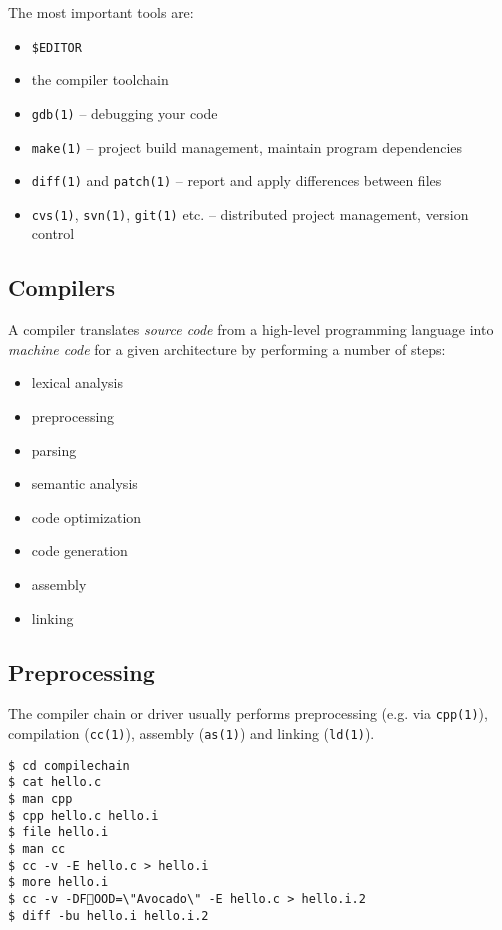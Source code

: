\documentclass[xga]{xdvislides}
\begin{document}
The most important tools are:
\begin{itemize}
	\item \verb+$EDITOR+
	\item the compiler toolchain
	\item {\tt gdb(1)} -- debugging your code
	\item {\tt make(1)} -- project build management, maintain program
		dependencies
	\item {\tt diff(1)} and {\tt patch(1)} -- report and apply differences
		between files
	\item {\tt cvs(1)}, {\tt svn(1)}, {\tt git(1)} etc. -- distributed project management,
		 version control
\end{itemize}

\subsection{Compilers}

A compiler translates {\em source code} from a high-level programming
language into {\em machine code} for a given architecture by performing a
number of steps:

\begin{itemize}
	\item lexical analysis
	\item preprocessing
	\item parsing
	\item semantic analysis
	\item code optimization
	\item code generation
	\item assembly
	\item linking
\end{itemize}

\subsection{Preprocessing}

The compiler chain or driver usually performs
preprocessing (e.g. via {\tt cpp(1)}), compilation
({\tt cc(1)}), assembly ({\tt as(1)}) and linking
({\tt ld(1)}).

\begin{verbatim}
$ cd compilechain
$ cat hello.c
$ man cpp
$ cpp hello.c hello.i
$ file hello.i
$ man cc
$ cc -v -E hello.c > hello.i
$ more hello.i
$ cc -v -DFOOD=\"Avocado\" -E hello.c > hello.i.2
$ diff -bu hello.i hello.i.2
\end{verbatim}
\end{document}
